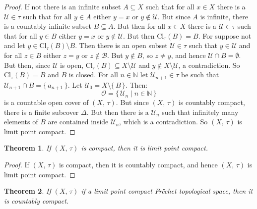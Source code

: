 \documentclass{article}
\theoremstyle{plain}
\newtheorem{theorem}{Theorem}[section]
\theoremstyle{normal}
\begin{document}
        \begin{proof}
            If not there is an infinite subset $A\subseteq{X}$ such that for
            all $x\in{X}$ there is a $\mathcal{U}\in\tau$ such that for all
            $y\in{A}$ either $y=x$ or $y\notin\mathcal{U}$. But since
            $A$ is infinite, there is a countably infinite subset
            $B\subseteq{A}$. But then for all $x\in{X}$ there is a
            $\mathcal{U}\in\tau$ such that for all $y\in{B}$ either
            $y=x$ or $y\notin\mathcal{U}$. But then
            $\textrm{Cl}_{\tau}(B)=B$. For suppose not and let
            $y\in\textrm{Cl}_{\tau}(B)\setminus{B}$. Then there is an open
            subset $\mathcal{U}\in\tau$ such that $y\in\mathcal{U}$ and for
            all $z\in{B}$ either $z=y$ or $z\notin\mathcal{B}$. But
            $y\notin{B}$, so $z\ne{y}$, and hence
            $\mathcal{U}\cap{B}=\emptyset$. But then, since $\mathcal{U}$ is
            open, $\textrm{Cl}_{\tau}(B)\subseteq{X}\setminus\mathcal{U}$ and
            $y\notin{X}\setminus\mathcal{U}$, a contradiction. So
            $\textrm{Cl}_{\tau}(B)=B$ and $B$ is closed. For all
            $n\in\mathbb{N}$ let $\mathcal{U}_{n+1}\in\tau$ be such that
            $\mathcal{U}_{n+1}\cap{B}=\{\,a_{n+1}\,\}$. Let
            $\mathcal{U}_{0}=X\setminus\{\,B\,\}$. Then:
            \begin{equation}
                \mathcal{O}=
                \{\,\mathcal{U}_{n}\;|\;n\in\mathbb{N}\,\}
            \end{equation}
            is a countable open cover of $(X,\,\tau)$. But since $(X,\,\tau)$
            is countably compact, there is a finite subcover $\Delta$. But
            then there is a $\mathcal{U}_{n}$ such that infinitely many
            elements of $B$ are contained inside $\mathcal{U}_{n}$, which is
            a contradiction. So $(X,\,\tau)$ is limit point compact.
        \end{proof}
        \begin{theorem}
            If $(X,\,\tau)$ is compact, then it is limit point compact.
        \end{theorem}
        \begin{proof}
            If $(X,\,\tau)$ is compact, then it is countably compact, and hence
            $(X,\,\tau)$ is limit point compact.
        \end{proof}
        \begin{theorem}
            If $(X,\,\tau)$ if a limit point compact Fr\"{e}chet topological
            space, then it is countably compact.
        \end{theorem}
\end{document}
